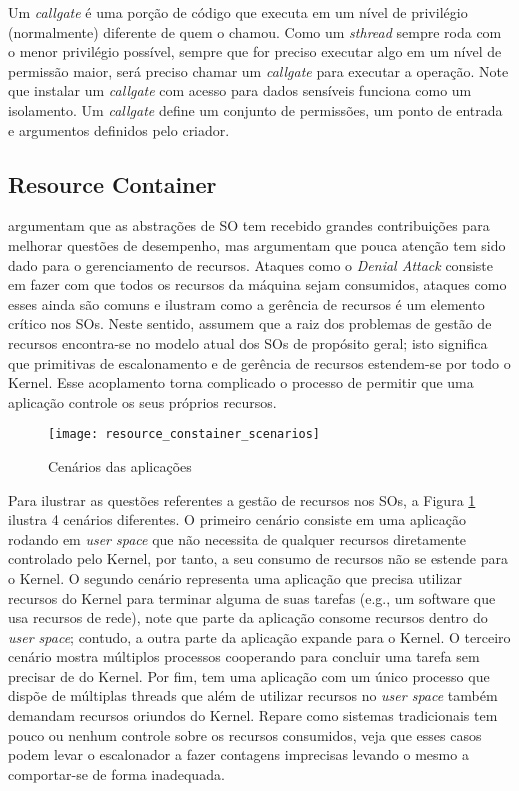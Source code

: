 Um \emph{callgate} é uma porção de código que executa em um nível de privilégio
(normalmente) diferente de quem o chamou. Como um \emph{sthread} sempre roda
com o menor privilégio possível, sempre que for preciso executar algo em um
nível de permissão maior, será preciso chamar um \emph{callgate} para executar
a operação. Note que instalar um \emph{callgate} com acesso para dados
sensíveis funciona como um isolamento. Um \emph{callgate} define um conjunto de
permissões, um ponto de entrada e argumentos definidos pelo criador.

\subsection{Resource Container}

\cite{resourcecontainers} argumentam que as abstrações de SO tem recebido
grandes contribuições para melhorar questões de desempenho, mas argumentam que
pouca atenção tem sido dado para o gerenciamento de recursos. Ataques como o
\emph{Denial Attack} consiste em fazer com que todos os recursos da máquina
sejam consumidos, ataques como esses ainda são comuns e ilustram como a
gerência de recursos é um elemento crítico nos SOs. Neste sentido,
\cite{resourcecontainers} assumem que a raiz dos problemas de gestão de
recursos encontra-se no modelo atual dos SOs de propósito geral; isto significa
que primitivas de escalonamento e de gerência de recursos estendem-se por todo
o Kernel. Esse acoplamento torna complicado o processo de permitir que uma
aplicação controle os seus próprios recursos.

\begin{figure}[!h]
  \centering
  \texttt{[image: resource\_constainer\_scenarios]} 
  \caption{Cenários das aplicações}
  \label{fig:resource_constainer_scenarios}
\end{figure}

Para ilustrar as questões referentes a gestão de recursos nos SOs, a Figura
\ref{fig:resource_constainer_scenarios} ilustra 4 cenários diferentes. O
primeiro cenário consiste em uma aplicação rodando em \textit{user space} que
não necessita de qualquer recursos diretamente controlado pelo Kernel, por
tanto, a seu consumo de recursos não se estende para o Kernel. O segundo
cenário representa uma aplicação que precisa utilizar recursos do Kernel para
terminar alguma de suas tarefas (e.g., um software que usa recursos de rede),
note que parte da aplicação consome recursos dentro do \textit{user space};
contudo, a outra parte da aplicação expande para o Kernel. O terceiro cenário
mostra múltiplos processos cooperando para concluir uma tarefa sem precisar de
do Kernel. Por fim, tem uma aplicação com um único processo que dispõe de
múltiplas threads que além de utilizar recursos no \textit{user space} também
demandam recursos oriundos do Kernel. Repare como sistemas tradicionais tem
pouco ou nenhum controle sobre os recursos consumidos, veja que esses casos
podem levar o escalonador a fazer contagens imprecisas levando o mesmo a
comportar-se de forma inadequada.

